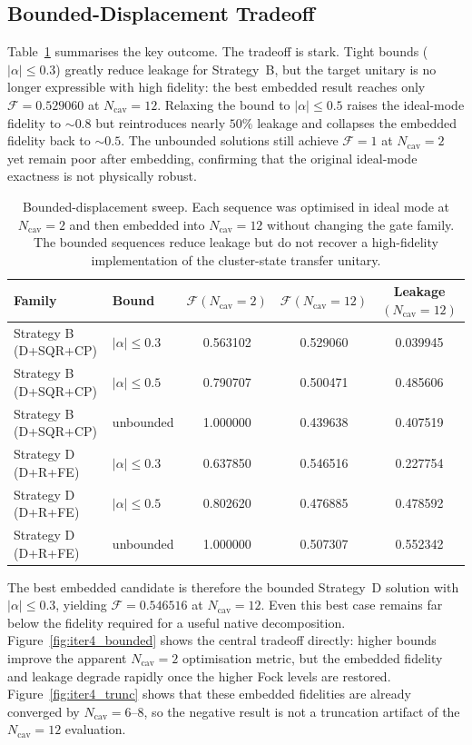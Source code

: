 \documentclass[aps,pra,twocolumn,reprint,floatfix,amsmath,amssymb]{revtex4-2}
\begin{document}
\subsection{Bounded-Displacement Tradeoff}

Table~\ref{tab:iter4_bounded} summarises the key outcome.  The
tradeoff is stark.  Tight bounds ($|\alpha|\leq 0.3$) greatly
reduce leakage for Strategy~B, but the target unitary is no longer
expressible with high fidelity: the best embedded result reaches
only $\mathcal{F}=0.529060$ at $N_\mathrm{cav}=12$.  Relaxing the
bound to $|\alpha|\leq 0.5$ raises the ideal-mode fidelity to
$\sim 0.8$ but reintroduces nearly $50\%$ leakage and collapses the
embedded fidelity back to $\sim 0.5$.  The unbounded solutions still
achieve $\mathcal{F}=1$ at $N_\mathrm{cav}=2$ yet remain poor after
embedding, confirming that the original ideal-mode exactness is not
physically robust.

\begin{table}[t]
  \centering
  \caption{Bounded-displacement sweep.  Each sequence was optimised in
  ideal mode at $N_\mathrm{cav}=2$ and then embedded into
  $N_\mathrm{cav}=12$ without changing the gate family.  The bounded
  sequences reduce leakage but do not recover a high-fidelity
  implementation of the cluster-state transfer unitary.}
  \label{tab:iter4_bounded}
  \begin{tabular}{@{} l l c c c @{}}
    \toprule
    Family & Bound & $\mathcal{F}(N_\mathrm{cav}=2)$ & $\mathcal{F}(N_\mathrm{cav}=12)$ & Leakage$(N_\mathrm{cav}=12)$ \\
    \midrule
    Strategy B (D+SQR+CP) & $|\alpha|\leq 0.3$ & 0.563102 & 0.529060 & 0.039945 \\
    Strategy B (D+SQR+CP) & $|\alpha|\leq 0.5$ & 0.790707 & 0.500471 & 0.485606 \\
    Strategy B (D+SQR+CP) & unbounded & 1.000000 & 0.439638 & 0.407519 \\
    Strategy D (D+R+FE) & $|\alpha|\leq 0.3$ & 0.637850 & 0.546516 & 0.227754 \\
    Strategy D (D+R+FE) & $|\alpha|\leq 0.5$ & 0.802620 & 0.476885 & 0.478592 \\
    Strategy D (D+R+FE) & unbounded & 1.000000 & 0.507307 & 0.552342 \\
    \bottomrule
  \end{tabular}
\end{table}

The best embedded candidate is therefore the bounded Strategy~D
solution with $|\alpha|\leq 0.3$, yielding
$\mathcal{F}=0.546516$ at $N_\mathrm{cav}=12$.  Even this best case
remains far below the fidelity required for a useful native
decomposition.  Figure~\ref{fig:iter4_bounded} shows the central
tradeoff directly: higher bounds improve the apparent
$N_\mathrm{cav}=2$ optimisation metric, but the embedded fidelity and
leakage degrade rapidly once the higher Fock levels are restored.
Figure~\ref{fig:iter4_trunc} shows that these embedded fidelities are
already converged by $N_\mathrm{cav}=6$--$8$, so the negative result
is not a truncation artifact of the $N_\mathrm{cav}=12$ evaluation.
\end{document}
